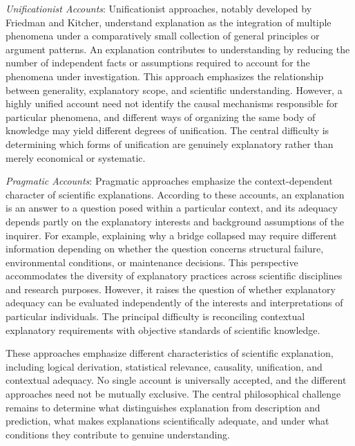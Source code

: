 \emph{Unificationist Accounts}: Unificationist approaches, notably developed by Friedman and Kitcher, understand explanation as the integration of multiple phenomena under a comparatively small collection of general principles or argument patterns. An explanation contributes to understanding by reducing the number of independent facts or assumptions required to account for the phenomena under investigation. This approach emphasizes the relationship between generality, explanatory scope, and scientific understanding. However, a highly unified account need not identify the causal mechanisms responsible for particular phenomena, and different ways of organizing the same body of knowledge may yield different degrees of unification. The central difficulty is determining which forms of unification are genuinely explanatory rather than merely economical or systematic.

\emph{Pragmatic Accounts}: Pragmatic approaches emphasize the context-dependent character of scientific explanations. According to these accounts, an explanation is an answer to a question posed within a particular context, and its adequacy depends partly on the explanatory interests and background assumptions of the inquirer. For example, explaining why a bridge collapsed may require different information depending on whether the question concerns structural failure, environmental conditions, or maintenance decisions. This perspective accommodates the diversity of explanatory practices across scientific disciplines and research purposes. However, it raises the question of whether explanatory adequacy can be evaluated independently of the interests and interpretations of particular individuals. The principal difficulty is reconciling contextual explanatory requirements with objective standards of scientific knowledge.

These approaches emphasize different characteristics of scientific explanation, including logical derivation, statistical relevance, causality, unification, and contextual adequacy. No single account is universally accepted, and the different approaches need not be mutually exclusive. The central philosophical challenge remains to determine what distinguishes explanation from description and prediction, what makes explanations scientifically adequate, and under what conditions they contribute to genuine understanding.

%
%

